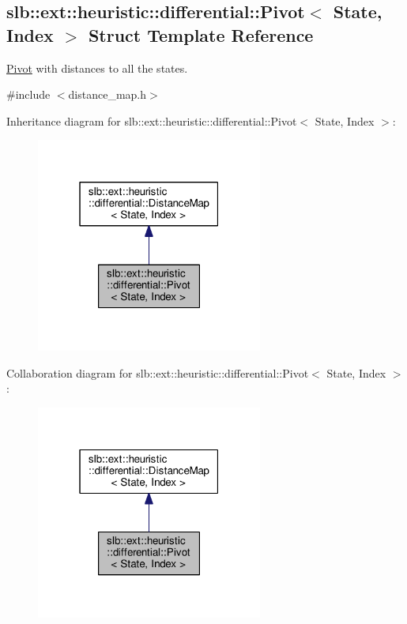 \hypertarget{structslb_1_1ext_1_1heuristic_1_1differential_1_1Pivot}{}\subsection{slb\+:\+:ext\+:\+:heuristic\+:\+:differential\+:\+:Pivot$<$ State, Index $>$ Struct Template Reference}
\label{structslb_1_1ext_1_1heuristic_1_1differential_1_1Pivot}


\hyperlink{structslb_1_1ext_1_1heuristic_1_1differential_1_1Pivot}{Pivot} with distances to all the states.  




{\ttfamily \#include $<$distance\+\_\+map.\+h$>$}



Inheritance diagram for slb\+:\+:ext\+:\+:heuristic\+:\+:differential\+:\+:Pivot$<$ State, Index $>$\+:\nopagebreak
\begin{figure}[H]
\begin{center}
\leavevmode
\includegraphics[width=211pt]{structslb_1_1ext_1_1heuristic_1_1differential_1_1Pivot__inherit__graph}
\end{center}
\end{figure}


Collaboration diagram for slb\+:\+:ext\+:\+:heuristic\+:\+:differential\+:\+:Pivot$<$ State, Index $>$\+:\nopagebreak
\begin{figure}[H]
\begin{center}
\leavevmode
\includegraphics[width=211pt]{structslb_1_1ext_1_1heuristic_1_1differential_1_1Pivot__coll__graph}
\end{center}
\end{figure}
